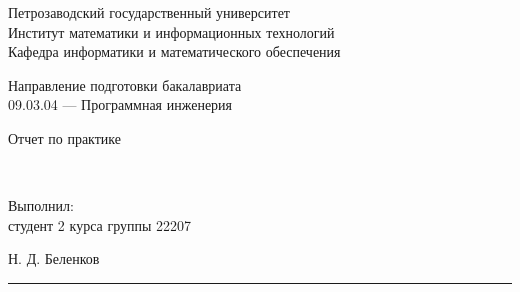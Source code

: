 \documentclass[a4paper,12pt]{article}
\newcommand{\myrule}[1]{\rule{#1}{0.4pt}}
\newcommand{\sign}[2][~]{{\small\myrule{#2}\\[-0.7em]\makebox[#2]{\it #1}}}
\renewcommand{\baselinestretch}{1.50}
\begin{document}

\thispagestyle{empty}
\begin{center}


\renewcommand{\baselinestretch}{1}
{\large
{\sc Петрозаводский государственный университет\\
Институт математики и информационных технологий\\
Кафедра информатики и математического обеспечения
}
}

\end{center}


\begin{center}
%
%
 Направление подготовки бакалавриата \\
09.03.04 --- Программная инженерия \\
\end{center}

\vfill

\begin{center}
{\normalsize 
	Отчет по практике}

\medskip

	{\Large {}} \\
\end{center}

\medskip

\begin{flushright}
\parbox{11cm}{%
\renewcommand{\baselinestretch}{1.2}
\normalsize
	Выполнил:\\
студент 2 курса группы 22207
\begin{flushright}
	Н. Д. Беленков \sign[подпись]{4cm}
\end{flushright}


}
\end{flushright}
\end{document}
